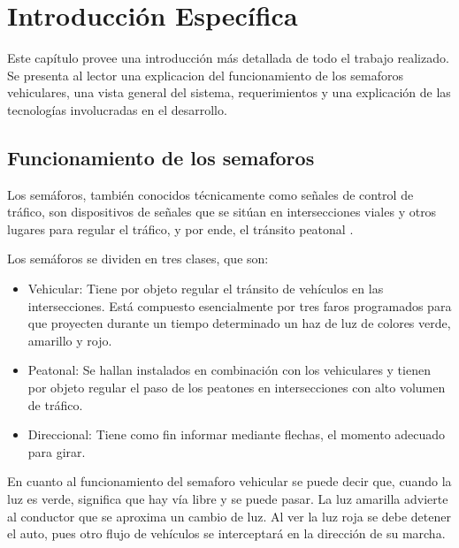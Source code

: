 \chapter{Introducción Específica} %

\label{Chapter2}


Este capítulo provee una introducción más detallada de todo el trabajo realizado.
Se presenta al lector una explicacion del funcionamiento  de los semaforos vehiculares, una vista general del sistema, requerimientos y una explicación de las tecnologías involucradas en el desarrollo.

\section{Funcionamiento de los semaforos}

Los semáforos, también conocidos técnicamente como señales de control de tráfico, son dispositivos de señales que se sitúan en intersecciones viales y otros lugares para regular el tráfico, y por ende, el tránsito peatonal \citep{semaforo}.

Los semáforos se dividen en tres clases, que son: 

\begin{itemize}
\item Vehicular: Tiene por objeto regular el tránsito de vehículos en las intersecciones. Está compuesto esencialmente por tres faros programados para que proyecten durante un tiempo determinado un haz de luz de colores verde, amarillo y rojo.
\item Peatonal: Se hallan instalados en combinación con los vehiculares y tienen por objeto regular el paso de los peatones en intersecciones con alto volumen de tráfico.
\item Direccional: Tiene como fin informar mediante flechas, el momento adecuado para girar. 
\end{itemize}

En cuanto al funcionamiento del semaforo vehicular se puede decir que, cuando la luz es verde, significa que hay vía libre y se puede pasar. La luz amarilla advierte al conductor que se aproxima un cambio de luz. Al ver la luz roja se debe detener el auto, pues otro flujo de vehículos se interceptará en la dirección de su marcha.

